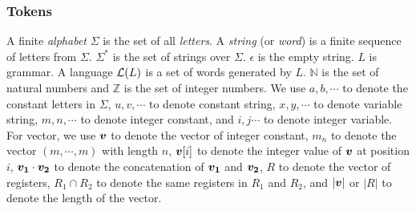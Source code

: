 \documentclass{standalone}
\begin{document}
\subsubsection{Tokens}
A finite \emph{alphabet} $\Sigma$ is the set of all \emph{letters}. A
\emph{string} (or \emph{word}) is a finite sequence of letters from $\Sigma$. $\Sigma^*$ is the set of strings over $\Sigma$. $\epsilon$ is the empty string. $L$ is grammar. A language $\mathcal{L}(L)$ is a set of words generated by $L$. $\mathbb{N}$ is the set of natural numbers and $\mathbb{Z}$ is the set of integer numbers. We use $a,
  b,\cdots$ to denote the constant letters in $\Sigma$, $u, v,\cdots$ to denote constant
string, $x, y,\cdots$ to denote variable string, $m,n,\cdots$ to
denote integer constant, and $i,j\cdots$ to denote integer variable. For vector, we use $\myvec{v}$ to denote the vector of integer constant, $m_n$ to denote the vector $(m,\cdots, m)$ with length $n$, $\myvec{v}[i]$ to denote the integer value of $\myvec{v}$ at position $i$, $\myvec{v_1}\cdot\myvec{v_2}$ to denote the concatenation of $\myvec{v_1}$ and $\myvec{v_2}$, $R$ to denote the vector of registers, $R_1 \cap R_2$ to denote the same registers in $R_1$ and $R_2$, and $|\myvec{v}|$ or $|R|$ to denote the length of the vector.
\end{document}
